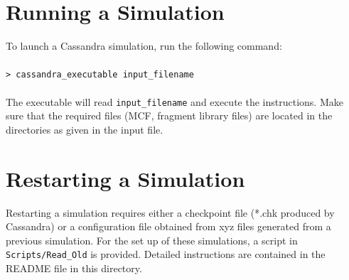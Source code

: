 %

\section{Running a Simulation}

To launch a Cassandra simulation, run the following command: \\ \\
%
\texttt{> cassandra\_executable input\_filename} \\ \\
%
The executable will read \texttt{input\_filename} and execute the instructions. Make sure that the required files (MCF, fragment library files) are located in the directories as given in the input file.

\section{Restarting a Simulation}
Restarting a simulation requires either a checkpoint file (*.chk produced
by Cassandra) or a configuration file obtained from xyz files generated
from a previous simulation. For the set up of these simulations, a script
in \texttt{Scripts/Read\_Old} is provided. Detailed instructions are contained
in the README file in this directory. 

